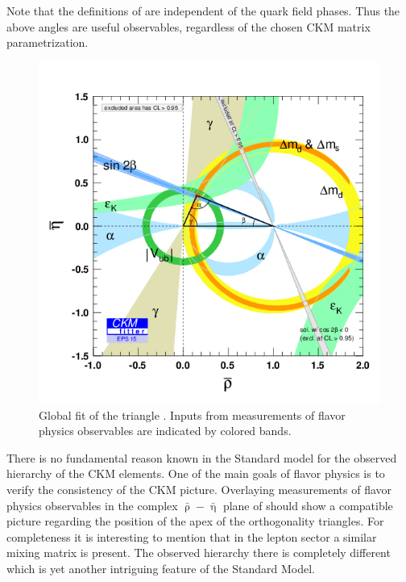 \noindent Note that the definitions of  are independent of
the quark field phases. Thus the above angles are useful observables, regardless of the chosen
CKM matrix parametrization.

\begin{figure}[!h]
  \centering
    \includegraphics[trim=0cm 0.5cm 0cm 1.5cm, clip=true, width=\textwidth]{Figures/Chapter1/rhoeta_large.png}
    \caption{Global fit of the \Bd triangle \cite{ckm-fitter-phis-pred}.
             Inputs from measurements of flavor physics observables are indicated by colored bands.}
    \label{unitarity_triangle}
\end{figure}

There is no fundamental reason known in the Standard model for the observed hierarchy of the CKM elements.
One of the main goals of flavor physics is to verify the consistency of the CKM picture.
Overlaying measurements of flavor physics observables in the complex $\bar{\uprho}-\bar{\upeta}$ plane
of  should show a compatible picture regarding the position of the
apex of the orthogonality triangles. For completeness it is interesting to mention that in the
lepton sector a similar mixing matrix is present. The observed hierarchy there is completely
different which is yet another intriguing feature of the Standard Model.

